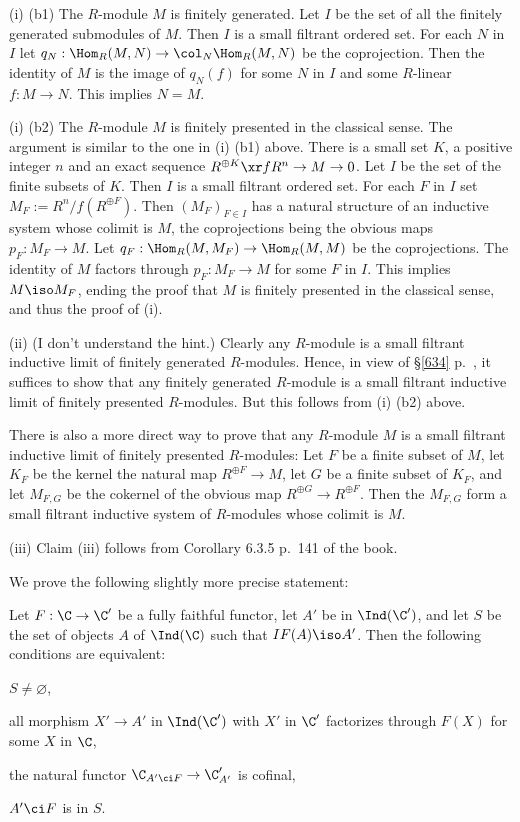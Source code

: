 \documentclass[12pt]{article}
\theoremstyle{remark}
\theoremstyle{definition}
\begin{document}
\nn(i) (b1) The $R$-module $M$ is finitely generated. Let $I$ be the set of all the finitely generated submodules of $M$. Then $I$ is a small filtrant ordered set. For each $N$ in $I$ let $q_N:\Hom_R(M,N)\to\col_N\Hom_R(M,N)$ be the coprojection. Then the identity of $M$ is the image of $q_N(f)$ for some $N$ in $I$ and some $R$-linear $f:M\to N$. This implies $N=M$. 

\nn(i) (b2) The $R$-module $M$ is finitely presented in the classical sense. The argument is similar to the one in (i) (b1) above. There is a small set $K$, a positive integer $n$ and an exact sequence $R^{\oplus K}\xr f R^n\to M\to0$. Let $I$ be the set of the finite subsets of $K$. Then $I$ is a small filtrant ordered set. For each $F$ in $I$ set $M_F:=R^n/f(R^{\oplus F})$. Then $(M_F)_{F\in I}$ has a natural structure of an inductive system whose colimit is $M$, the coprojections being the obvious maps $p_F:M_F\to M$. Let $q_F:\Hom_R(M,M_F)\to\Hom_R(M,M)$ be the coprojections. The identity of $M$ factors through $p_F:M_F\to M$ for some $F$ in $I$. This implies $M\iso M_F$, ending the proof that $M$ is finitely presented in the classical sense, and thus the proof of (i).

\nn(ii) (I don't understand the hint.) Clearly any $R$-module is a small filtrant inductive limit of finitely generated $R$-modules. Hence, in view of \S\ref{634} p.~, it suffices to show that any finitely generated $R$-module is a small filtrant inductive limit of finitely presented $R$-modules. But this follows from (i) (b2) above.

There is also a more direct way to prove that any $R$-module $M$ is a small filtrant inductive limit of finitely presented $R$-modules: Let $F$ be a finite subset of $M$, let $K_F$ be the kernel the natural map $R^{\oplus F}\to M$, let $G$ be a finite subset of $K_F$, and let $M_{F,G}$ be the cokernel of the obvious map $R^{\oplus G}\to R^{\oplus F}$. Then the $M_{F,G}$ form a small filtrant inductive system of $R$-modules whose colimit is $M$.

\nn(iii) Claim (iii) follows from Corollary 6.3.5 p.~141 of the book.



We prove the following slightly more precise statement:

\begin{prop}
Let $F:\C\to\C'$ be a fully faithful functor, let $A'$ be in $\Ind(\C')$, and let $S$ be the set of objects $A$ of $\Ind(\C)$ such that $IF(A)\iso A'$. Then the following conditions are equivalent: 

 $S\neq\varnothing$, 

 all morphism $X'\to A'$ in $\Ind(\C')$ with $X'$ in $\C'$ factorizes through $F(X)$ for some $X$ in $\C$, 

 the natural functor $\C_{A'\ci F}\to\C'_{A'}$ is cofinal, 

 $A'\ci F$ is in $S$.
\end{prop}
\end{document}
